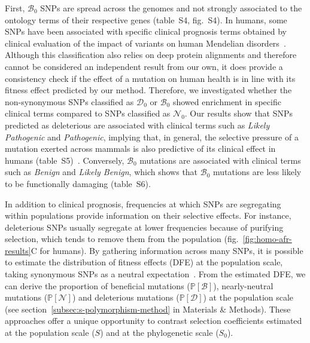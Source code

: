 \documentclass{article}
\newcommand{\proba}{\mathbb{P}}
\newcommand{\Sphy}{S_{0}}
\newcommand{\SphyDel}{\mathcal{D}_0}
\newcommand{\SphyNeu}{\mathcal{N}_0}
\newcommand{\SphyBen}{\mathcal{B}_0}
\newcommand{\Spop}{S}
\newcommand{\SpopDel}{\mathcal{D}}
\newcommand{\SpopNeu}{\mathcal{N}}
\newcommand{\SpopBen}{\mathcal{B}}
\newcommand{\ProbaPopDel}{\proba [ \SpopDel]}
\newcommand{\ProbaPopNeu}{\proba [ \SpopNeu ]}
\newcommand{\ProbaPopBen}{\proba [ \SpopBen ]}
\begin{document}
    First, $\SphyBen$ SNPs are spread across the genomes and not strongly associated to the ontology terms of their respective genes (table~S4, fig.~S4).
    In humans, some SNPs have been associated with specific clinical prognosis terms obtained by clinical evaluation of the impact of variants on human Mendelian disorders~\cite{landrum_clinvar_2018}.
    Although this classification also relies on deep protein alignments and therefore cannot be considered an independent result from our own, it does provide a consistency check if the effect of a mutation on human health is in line with its fitness effect predicted by our method.
    Therefore, we investigated whether the non-synonymous SNPs classified as $\SphyDel$ or $\SphyBen$ showed enrichment in specific clinical terms compared to SNPs classified as $\SphyNeu$.
    Our results show that SNPs predicted as deleterious are associated with clinical terms such as \textit{Likely Pathogenic} and \textit{Pathogenic}, implying that, in general, the selective pressure of a mutation exerted across mammals is also predictive of its clinical effect in humans (table~S5)~\cite{sullivan_leveraging_2023}.
    Conversely, $\SphyBen$ mutations are associated with clinical terms such as \textit{Benign} and \textit{Likely Benign}, which shows that $\SphyBen$ mutations are less likely to be functionally damaging (table~S6).

    In addition to clinical prognosis, frequencies at which SNPs are segregating within populations provide information on their selective effects.
    For instance, deleterious SNPs usually segregate at lower frequencies because of purifying selection, which tends to remove them from the population (fig.~\ref{fig:homo-afr-results}C for humans).
    By gathering information across many SNPs, it is possible to estimate the distribution of fitness effects (DFE) at the population scale, taking synonymous SNPs as a neutral expectation~\cite{eyre-walker_distribution_2006, eyre-walker_estimating_2009, galtier_adaptive_2016, tataru_inference_2017}.
    From the estimated DFE, we can derive the proportion of beneficial mutations ($\ProbaPopBen$), nearly-neutral mutations ($\ProbaPopNeu$) and deleterious mutations ($\ProbaPopDel$) at the population scale (see section~\ref{subsec:s-polymorphism-method} in Materials \& Methods).
    These approaches offer a unique opportunity to contrast selection coefficients estimated at the population scale ($\Spop$) and at the phylogenetic scale ($\Sphy$).
\end{document}
